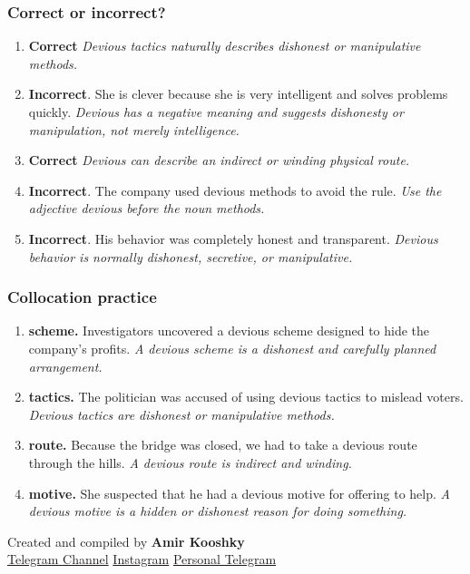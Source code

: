 \documentclass[11pt]{article}
\begin{document}
\subsubsection{Correct or incorrect?}
\begin{enumerate}
  \item \textbf{Correct} \emph{Devious tactics naturally describes dishonest or manipulative methods.}
  \item \textbf{Incorrect}. She is clever because she is very intelligent and solves problems quickly. \emph{Devious has a negative meaning and suggests dishonesty or manipulation, not merely intelligence.}
  \item \textbf{Correct} \emph{Devious can describe an indirect or winding physical route.}
  \item \textbf{Incorrect}. The company used devious methods to avoid the rule. \emph{Use the adjective devious before the noun methods.}
  \item \textbf{Incorrect}. His behavior was completely honest and transparent. \emph{Devious behavior is normally dishonest, secretive, or manipulative.}
\end{enumerate}

\subsubsection{Collocation practice}
\begin{enumerate}
  \item \textbf{scheme.} Investigators uncovered a devious scheme designed to hide the company's profits. \emph{A devious scheme is a dishonest and carefully planned arrangement.}
  \item \textbf{tactics.} The politician was accused of using devious tactics to mislead voters. \emph{Devious tactics are dishonest or manipulative methods.}
  \item \textbf{route.} Because the bridge was closed, we had to take a devious route through the hills. \emph{A devious route is indirect and winding.}
  \item \textbf{motive.} She suspected that he had a devious motive for offering to help. \emph{A devious motive is a hidden or dishonest reason for doing something.}
\end{enumerate}

\vfill
\begin{center}
\small\color{Muted} Created and compiled by \textbf{Amir Kooshky}\\
\href{https://t.me/KooshkyTOEFL}{Telegram Channel}\quad\textbullet\quad
\href{https://www.instagram.com/kooshkytoefl}{Instagram}\quad\textbullet\quad
\href{https://t.me/KooshkyTOEFL\_pv}{Personal Telegram}
\end{center}
\end{document}
